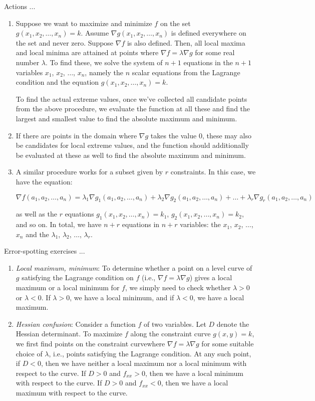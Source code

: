 \documentclass[10pt]{amsart}
\begin{document}
Actions ...

\begin{enumerate}
\item Suppose we want to maximize and minimize $f$ on the set
  $g(x_1,x_2,\dots,x_n) = k$. Assume $\nabla g(x_1,x_2,\dots,x_n)$ is
  defined everywhere on the set and never zero. Suppose $\nabla f$ is
  also defined. Then, all local maxima and local minima are attained
  at points where $\nabla f = \lambda \nabla g$ for some real number
  $\lambda$. To find these, we solve the system of $n + 1$ equations
  in the $n+1$ variables $x_1$, $x_2$, $\dots$, $x_n$, namely the $n$
  scalar equations from the Lagrange condition and the equation
  $g(x_1,x_2,\dots,x_n) = k$.

  To find the actual extreme values, once we've collected all
  candidate points from the above procedure, we evaluate the function
  at all these and find the largest and smallest value to find the
  absolute maximum and minimum.

\item If there are points in the domain where $\nabla g$ takes the
  value $0$, these may also be candidates for local extreme values,
  and the function should additionally be evaluated at these as well
  to find the absolute maximum and minimum.
\item A similar procedure works for a subset given by $r$
  constraints. In this case, we have the equation:

  $$\nabla f(a_1,a_2,\dots,a_n) = \lambda_1\nabla g_1(a_1,a_2,\dots,a_n) + \lambda_2\nabla g_2(a_1,a_2,\dots,a_n) + \dots + \lambda_r\nabla g_r(a_1,a_2,\dots,a_n)$$

  as well as the $r$ equations $g_1(x_1,x_2,\dots,x_n) = k_1$,
  $g_2(x_1,x_2,\dots,x_n) = k_2$, and so on. In total, we have
  $n + r$ equations in $n + r$ variables: the $x_1$, $x_2$, $\dots$,
  $x_n$ and the $\lambda_1$, $\lambda_2$, $\dots$, $\lambda_r$.
\end{enumerate}

Error-spotting exercises ...

\begin{enumerate}
\item {\em Local maximum, minimum}: To determine whether a point on a
  level curve of $g$ satisfying the Lagrange condition on $f$ (i.e.,
  $\nabla f = \lambda \nabla g$) gives a local maximum or a local
  minimum for $f$, we simply need to check whether $\lambda > 0$ or
  $\lambda < 0$. If $\lambda > 0$, we have a local minimum, and if
  $\lambda < 0$, we have a local maximum.
\item {\em Hessian confusion}: Consider a function $f$ of two
  variables. Let $D$ denote the Hessian determinant. To maximize $f$
  along the constraint curve $g(x,y) = k$, we first find points on the
  constraint curvewhere $\nabla f = \lambda \nabla g$ for some
  suitable choice of $\lambda$, i.e., points satisfying the Lagrange
  condition. At any such point, if $D < 0$, then we have neither a
  local maximum nor a local minimum with respect to the curve. If $D >
  0$ and $f_{xx} > 0$, then we have a local minimum with respect to
  the curve. If $D > 0$ and $f_{xx} < 0$, then we have a local maximum
  with respect to the curve.
\end{enumerate}
\end{document}
